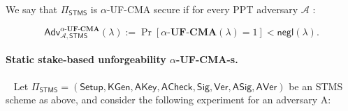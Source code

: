 \documentclass{article}
\begin{document}
We say that $\Pi_{\mathsf{STMS}}$ is $\alpha$-\textsf{UF-CMA} secure if for every PPT adversary $\mathcal{A}$ :

\[
    \mathsf{Adv}^{\alpha\textbf{-UF-CMA}}_{\mathcal{A},\mathsf{STMS}}(\lambda) := \Pr[\alpha\textbf{-UF-CMA}(\lambda) = 1 ]< \mathsf{negl}(\lambda).
\]





\paragraph{Static stake-based unforgeability $\alpha$-\textsf{UF-CMA-s}.} \ 
\newline
Let $\Pi_{\mathsf{STMS}}
  =
  (\mathsf{Setup}, \mathsf{KGen}, \mathsf{AKey}, \mathsf{ACheck},
   \mathsf{Sig}, \mathsf{Ver}, \mathsf{ASig}, \mathsf{AVer})$ be an STMS scheme as above, and consider the following experiment for an adversary A:
   
\end{document}
